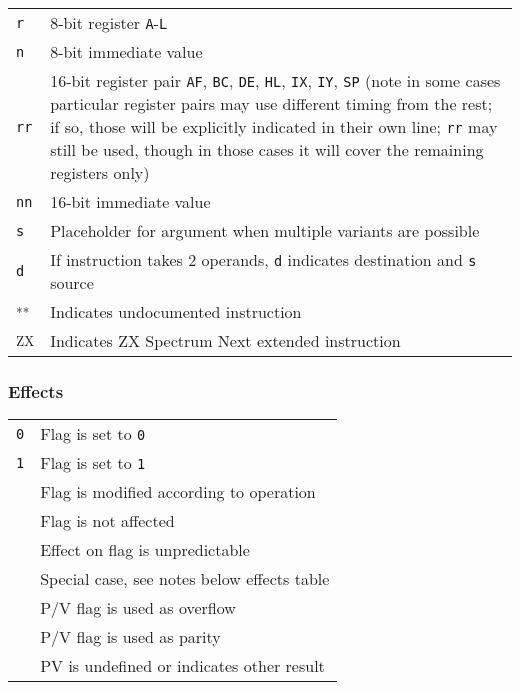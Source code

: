 \documentclass[12pt,twoside,openright,a4paper]{book}
\newcommand{\UNDOC}{\textnormal{\textsuperscript{**}}}
\newcommand{\ZXN}{\textnormal{\textsuperscript{ZX}}}
\begin{document}
\begin{tabularx}{\textwidth}{lX}
	{\tt r} & 
		8-bit register {\tt A}-{\tt L} \\
	{\tt n} &
		8-bit immediate value \\
	{\tt rr} & 
		16-bit register pair {\tt AF}, {\tt BC}, {\tt DE}, {\tt HL}, {\tt IX}, {\tt IY}, {\tt SP} (note in some cases particular register pairs may use different timing from the rest; if so, those will be explicitly indicated in their own line; {\tt rr} may still be used, though in those cases it will cover the remaining registers only) \\
	{\tt nn} & 
		16-bit immediate value \\
	{\tt s} &
		Placeholder for argument when multiple variants are possible \\
	{\tt d} &
		If instruction takes 2 operands, {\tt d} indicates destination and {\tt s} source \\
	\UNDOC & Indicates undocumented instruction \\
	\ZXN & Indicates ZX Spectrum Next extended instruction \\		
\end{tabularx}

\subsubsection{Effects}

\begin{tabular}{cl}
	{\tt 0} & Flag is set to {\tt 0} \\
	{\tt 1} & Flag is set to {\tt 1} \\
	{\tt \FS} & Flag is modified according to operation \\
	{\tt \FN} & Flag is not affected \\
	{\tt \FU} & Effect on flag is unpredictable \\
	{\tt \FX} & Special case, see notes below effects table \\
	\DetailParityOverflow{v} & P/V flag is used as overflow \\
	\DetailParityOverflow{p} & P/V flag is used as parity \\
	\DetailParityOverflow{} & PV is undefined or indicates other result \\
\end{tabular}
\end{document}
